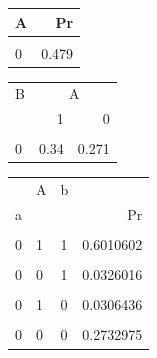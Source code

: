 \documentclass[
  10pt,
  dvipsnames,enabledeprecatedfontcommands]{scrartcl}
\begin{document}
\begin{figure}
\hspace{2mm}\begin{subfigure}[ht!]{0.45\textwidth}
\footnotesize


\begin{tabular}{lr}
\toprule
A & Pr\\
\midrule
\cellcolor{gray!6}{1} & \cellcolor{gray!6}{0.521}\\
0 & 0.479\\
\bottomrule
\end{tabular}

\vspace{2mm}

\begin{tabular}{lrr}
\toprule
\multicolumn{1}{c}{B} & \multicolumn{2}{c}{A} \\
  & 1 & 0\\
\midrule
\cellcolor{gray!6}{1} & \cellcolor{gray!6}{0.66} & \cellcolor{gray!6}{0.729}\\
0 & 0.34 & 0.271\\
\bottomrule
\end{tabular}

\vspace{2mm}

\begin{tabular}{lllr}
\toprule
\multicolumn{1}{c}{} & \multicolumn{1}{c}{A} & \multicolumn{1}{c}{b} & \multicolumn{1}{c}{} \\
a &  &  & Pr\\
\midrule
\cellcolor{gray!6}{1} & \cellcolor{gray!6}{1} & \cellcolor{gray!6}{1} & \cellcolor{gray!6}{0.3989398}\\
0 & 1 & 1 & 0.6010602\\
\cellcolor{gray!6}{1} & \cellcolor{gray!6}{0} & \cellcolor{gray!6}{1} & \cellcolor{gray!6}{0.9673984}\\
0 & 0 & 1 & 0.0326016\\
\cellcolor{gray!6}{1} & \cellcolor{gray!6}{1} & \cellcolor{gray!6}{0} & \cellcolor{gray!6}{0.9693564}\\
0 & 1 & 0 & 0.0306436\\
\cellcolor{gray!6}{1} & \cellcolor{gray!6}{0} & \cellcolor{gray!6}{0} & \cellcolor{gray!6}{0.7267025}\\
0 & 0 & 0 & 0.2732975\\
\bottomrule
\end{tabular}

\vspace{2mm}


\end{subfigure}
\end{figure}
\end{document}
